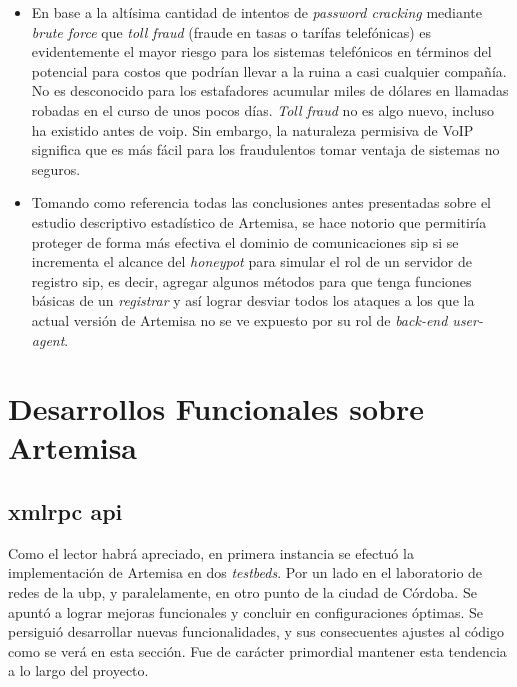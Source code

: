 \documentclass[a4paper,12pt]{report}
\begin{document}
{\begin{itemize}
\item{En base a la altísima cantidad
de intentos de \emph{password cracking} mediante \emph{brute force} que \emph{toll fraud} 
(fraude en tasas o tarífas telefónicas) es evidentemente el mayor riesgo para los sistemas telefónicos en términos del potencial
para costos que podrían llevar a la ruina a casi cualquier compañía. No es desconocido para los
estafadores acumular miles de dólares en llamadas robadas en el curso de unos pocos días. 
\emph{Toll fraud} no es algo nuevo, incluso ha existido antes de \ac{voip}. Sin embargo, la naturaleza permisiva
de VoIP significa que es más fácil para los fraudulentos tomar ventaja de sistemas no seguros.}

\item{Tomando como referencia todas las conclusiones antes presentadas sobre el estudio 
descriptivo estadístico de Artemisa, se hace notorio que permitiría proteger de forma más efectiva
el dominio de comunicaciones \ac{sip} si se incrementa el alcance del
\emph{honeypot} para simular el rol de un servidor de registro \ac{sip}, es decir, agregar algunos
métodos para que tenga funciones básicas de un \emph{registrar} y así lograr desviar todos los ataques
a los que la actual versión de Artemisa no se ve expuesto por su rol de \emph{back-end user-agent}.}
\end{itemize}

\clearpage

\section{Desarrollos Funcionales sobre Artemisa}
\label{desarrollos_funcionales}
\subsection{\ac{xmlrpc} \ac{api}}

Como el lector habrá apreciado, en primera instancia se efectuó la
implementación de Artemisa en dos \emph{testbeds}. Por un lado en el
laboratorio de redes de la \ac{ubp}, y paralelamente, en otro
punto de la ciudad de Córdoba. Se apuntó a lograr mejoras funcionales y
concluir en \mbox{configuraciones} óptimas.
Se persiguió desarrollar nuevas funcionalidades, y sus consecuentes ajustes al
código como se verá en esta sección. Fue de carácter
primordial mantener esta tendencia a lo largo del proyecto.   

}
\end{document}
